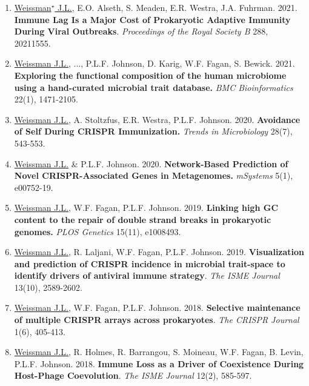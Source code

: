 \documentclass[]{res}
\begin{document}
\begin{resume}
\begin{enumerate}[leftmargin=*]
\item \underline{Weissman$^\star$ J.L.}, E.O. Alseth, S. Meaden, E.R. Westra, J.A. Fuhrman. 2021. {\bf Immune Lag Is a Major Cost of Prokaryotic Adaptive Immunity During Viral Outbreaks}. \emph{Proceedings of the Royal Society B} 288, 20211555.

\item \underline{Weissman J.L.}, ..., P.L.F. Johnson, D. Karig, W.F. Fagan, S. Bewick. 2021. {\bf Exploring the functional composition of the human microbiome using a hand-curated microbial trait database.} \emph{BMC Bioinformatics} 22(1), 1471-2105.


\item \underline{Weissman J.L.}, A. Stoltzfus, E.R. Westra, P.L.F. Johnson. 2020. {\bf Avoidance of Self During CRISPR Immunization.} \emph{Trends in Microbiology} 28(7), 543-553.

\item \underline{Weissman J.L.} \& P.L.F. Johnson. 2020. {\bf Network-Based Prediction of Novel CRISPR-Associated Genes in Metagenomes.} \emph{mSystems} 5(1), e00752-19.

 \item \underline{Weissman J.L.}, W.F. Fagan, P.L.F. Johnson. 2019. {\bf Linking high GC content to the repair of double strand breaks in prokaryotic genomes.} \emph{PLOS Genetics} 15(11), e1008493. %
 
 \item \underline{Weissman J.L.}, R. Laljani, W.F. Fagan, P.L.F. Johnson. 2019. {\bf Visualization and prediction of CRISPR incidence in microbial trait-space to identify drivers of antiviral immune strategy}. \emph{The ISME Journal} 13(10), 2589-2602. %

 \item \underline{Weissman J.L.}, W.F. Fagan, P.L.F. Johnson. 2018. {\bf Selective maintenance of multiple CRISPR arrays across prokaryotes}. \emph{The CRISPR Journal} 1(6), 405-413. %
 

\item \underline{Weissman J.L.}, R. Holmes, R. Barrangou, S. Moineau, W.F. Fagan, B. Levin, P.L.F. Johnson. 2018. {\bf Immune Loss as a Driver of Coexistence During Host-Phage Coevolution}. \emph{The ISME Journal} 12(2), 585-597. %

\end{enumerate} 


\end{resume}
\end{document}
